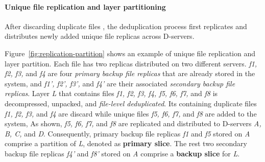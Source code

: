 \paragraph{Unique file replication and layer partitioning}

After discarding duplicate files%
, the deduplication process first replicates and distributes newly added unique file replicas across D-servers.

Figure~\ref{fig:replication-partition} shows an example of unique file replication and layer partition.
Each file has two replicas distributed on two different servers.
\emph{f1, f2, f3,} and \emph{f4} are four \emph{primary backup file replicas} that are already stored in the system,
and \emph{f1', f2', f3',} and \emph{f4'} are their associated \emph{secondary backup file replicas}. 
Layer \emph{L} that contains files \emph{f1, f2, f3, f4, f5, f6, f7,} and \emph{f8} 
is decompressed, unpacked, and \emph{file-level deduplicated}.
Its containing duplicate files \emph{f1, f2, f3,} and \emph{f4} are discard
while unique files
\emph{f5, f6, f7,} and \emph{f8} are added to the system, 
As shown, \emph{f5, f6, f7,} and \emph{f8} are replicated and distributed to D-servers \emph{A, B, C,} and \emph{D}.
Consequently,
primary backup file replicas \emph{f1} and \emph{f5} stored on \emph{A} comprise a partition of \emph{L},
denoted as \textbf{primary slice}.
The rest two secondary backup file replicas \emph{f4'} and \emph{f8'} stored on \emph{A} comprise a \textbf{backup slice} for \emph{L}.




